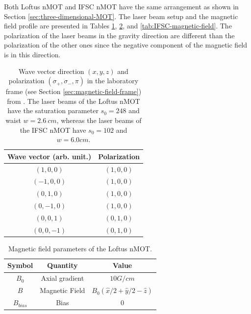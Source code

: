 Both Loftus nMOT and IFSC nMOT have the same arrangement as shown in Section \ref{sec:three-dimensional-MOT}. The laser beam setup and the magnetic field profile are presented in Tables \ref{tab:loftus-laser-beams}, \ref{tab:Loftus-magnetic-field}, and \ref{tab:IFSC-magnetic-field}. The polarization of the laser beams in the gravity direction are different than the polarization of the other ones since the negative component of the magnetic field is in this direction.

\begin{table}[ht!]
    \centering
    \begin{tabular}{|c|c|}
        \hline
        \textbf{Wave vector (arb. unit.)} & \textbf{Polarization} \\ \hline
        $ (1, 0, 0) $ & $ (1, 0, 0) $ \\
        $ (-1, 0, 0) $ & $ (1, 0, 0) $ \\
        $ (0, 1, 0) $ & $ (1, 0, 0) $ \\
        $ (0, -1, 0) $ & $ (1, 0, 0) $ \\
        $ (0, 0, 1) $ & $ (0, 1, 0) $ \\
        $ (0, 0, -1) $ & $ (0, 1, 0) $ \\
        \hline
    \end{tabular}
    \caption{Wave vector direction $ (x, y, z) $ and polarization $ (\sigma_+, \sigma_-, \pi) $ in the laboratory frame (see Section \ref{sec:magnetic-field-frame}) from \cite{loftus2004narrow}. The laser beams of the Loftus nMOT have the saturation parameter $ s_0 = 248 $ and waist $ w = 2.6\ cm $, whereas the laser beams of the IFSC nMOT have $ s_0 = 102 $ and $ w = 6.0cm$.}
    \label{tab:loftus-laser-beams}
\end{table}

\begin{table}[ht!]
    \centering
    \begin{tabular}{|c|c|c|}
        \hline
        \textbf{Symbol} & \textbf{Quantity} & \textbf{Value} \\ \hline
        $ B_0 $ & Axial gradient & $ 10 G / cm $ \\
        $ B $ & Magnetic Field & $ B_0(\hat{x}/2 + \hat{y}/2 - \hat{z}) $ \\
        $ B_{bias} $ & Bias & $ 0 $ \\
        \hline
    \end{tabular}
    \caption{Magnetic field parameters of the Loftus nMOT.}
    \label{tab:Loftus-magnetic-field}
\end{table}

